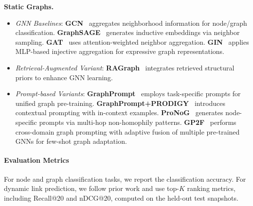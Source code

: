 \textbf{Static Graphs.}
\begin{itemize}
    \item \textit{GNN Baselines}:
    \textbf{GCN}~\cite{gcn_reference} aggregates neighborhood information for node/graph classification. 
    \textbf{GraphSAGE}~\cite{graphsage_reference} generates inductive embeddings via neighbor sampling. 
    \textbf{GAT}~\cite{gat_reference} uses attention-weighted neighbor aggregation. 
    \textbf{GIN}~\cite{gin_reference} applies MLP-based injective aggregation for expressive graph representations.

    \item \textit{Retrieval-Augmented Variant}:
    \textbf{RAGraph}~\cite{JiangQXZZ00X0W24} integrates retrieved structural priors to enhance GNN learning.

    \item \textit{Prompt-based Variants}:
    \textbf{GraphPrompt}~\cite{graphprompt_reference} employs task-specific prompts for unified graph pre-training. 
    \textbf{GraphPrompt+PRODIGY}~\cite{prodigy_reference} introduces contextual prompting with in-context examples. 
    \textbf{ProNoG}~\cite{yu2024nonhomophilic} generates node-specific prompts via multi-hop non-homophily patterns.
    \textbf{GP2F}~\cite{he2026gp2f} performs cross-domain graph prompting with adaptive fusion of multiple pre-trained GNNs for few-shot graph adaptation.
\end{itemize}





\paragraph{Evaluation Metrics}
For node and graph classification tasks, we report the classification accuracy.
For dynamic link prediction, we follow prior work and use top-$K$ ranking metrics,
including Recall@20 and nDCG@20, computed on the held-out test snapshots.

